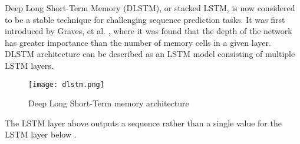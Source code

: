 Deep Long Short-Term Memory (DLSTM), or stacked LSTM, is now considered to be a stable technique for challenging sequence prediction tasks. It was first introduced by Graves, et al. \cite{gravesDLSTM}, where it was found that the depth of the network has greater importance than the number of memory cells in a given layer. DLSTM architecture can be described as an LSTM model consisting of multiple LSTM layers.

\begin{figure}[H]
	\centering
    \texttt{[image: dlstm.png]}
	\caption{Deep Long Short-Term memory architecture \cite{brownleeDLSTM}}
	\label{fig:dlstm}
\end{figure}

The LSTM layer above outputs a sequence rather than a single value for the LSTM layer below \cite{brownleeDLSTM}.

